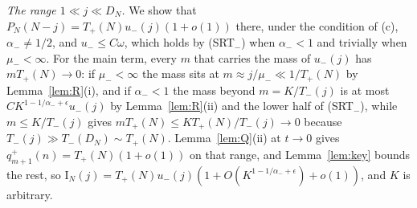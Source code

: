 \emph{The range $1\ll j\ll D_N$.} We show that $P_N(N-j)=T_\plus(N)u_\minus(j)(1+o(1))$ there, under
the condition of (c), $\alpha_\minus\ne1/2$, and $u_\minus\le C\omega$, which holds by (SRT$_\minus$)
when $\alpha_\minus<1$ and trivially when $\mu_\minus<\infty$. For the main term, every $m$ that
carries the mass of $u_\minus(j)$ has $mT_\plus(N)\to0$: if $\mu_\minus<\infty$ the mass sits at
$m\approx j/\mu_\minus\ll1/T_\plus(N)$ by Lemma~\ref{lem:R}(i), and if $\alpha_\minus<1$ the mass
beyond $m=K/T_\minus(j)$ is at most $CK^{1-1/\alpha_\minus+\epsilon}u_\minus(j)$ by Lemma~\ref{lem:R}(ii) and
the lower half of (SRT$_\minus$), while $m\le K/T_\minus(j)$ gives $mT_\plus(N)\le KT_\plus(N)/T_\minus(j)\to0$
because $T_\minus(j)\gg T_\minus(D_N)\sim T_\plus(N)$. Lemma~\ref{lem:Q}(ii) at $t\to0$ gives
$q^\plus_{m+1}(n)=T_\plus(N)(1+o(1))$ on that range, and Lemma~\ref{lem:key} bounds the rest, so
$\mathrm I_N(j)=T_\plus(N)u_\minus(j)(1+O(K^{1-1/\alpha_\minus+\epsilon})+o(1))$, and $K$ is arbitrary.

